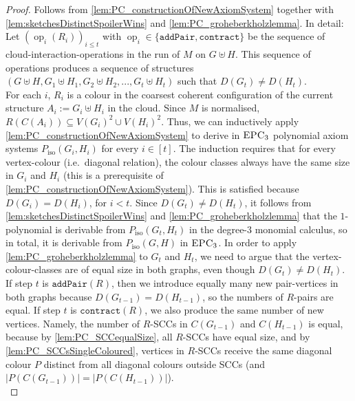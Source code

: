 \documentclass[10pt,a4paper]{article}
\newcommand{\EPC}{\mbox{\sc EPC}}
\newcommand{\pairOp }{\texttt{addPair}}
\newcommand{\sccOp }{\texttt{contract}}
\newcommand{\op}{\operatorname{op}}
\newcommand{\Piso}{P_{\text{iso}}}
\begin{document}
	\begin{proof}
		Follows from \autoref{lem:PC_constructionOfNewAxiomSystem} together with \autoref{lem:sketchesDistinctSpoilerWins} and \autoref{lem:PC_groheberkholzlemma}. In detail: Let $(\op_i(R_i))_{i \leq t}$ with $\op_i \in \{\pairOp, \sccOp\}$ be the sequence of cloud-interaction-operations in the run of $M$ on $G \uplus H$. This sequence of operations produces a sequence of structures $(G \uplus H, G_1 \uplus H_1, G_2 \uplus H_2, ..., G_t \uplus H_t)$ such that $D(G_t) \neq D(H_t)$.\\
		For each $i$, $R_i$ is a colour in the coarsest coherent configuration of the current structure $A_i := G_i \uplus H_i$ in the cloud. Since $M$ is normalised, $R(C(A_i)) \subseteq V(G_i)^2 \cup V(H_i)^2$. Thus, we can inductively apply \autoref{lem:PC_constructionOfNewAxiomSystem} to derive in $\EPC_3$ polynomial axiom systems $\Piso(G_i,H_i)$ for every $i \in [t]$. 
		The induction requires that for every vertex-colour (i.e.\ diagonal relation), the colour classes always have the same size in $G_i$ and $H_i$ (this is a prerequisite of \autoref{lem:PC_constructionOfNewAxiomSystem}). This is satisfied because $D(G_i) = D(H_i)$, for $i < t$.
		Since $D(G_t) \neq D(H_t)$, it follows from \autoref{lem:sketchesDistinctSpoilerWins} and \autoref{lem:PC_groheberkholzlemma} that the $1$-polynomial is derivable from  $\Piso(G_t,H_t)$ in the degree-$3$ monomial calculus, so in total, it is derivable from $\Piso(G,H)$ in $\EPC_3$. In order to apply \autoref{lem:PC_groheberkholzlemma} to $G_t$ and $H_t$, we need to argue that the vertex-colour-classes are of equal size in both graphs, even though $D(G_t) \neq D(H_t)$. If step $t$ is $\pairOp(R)$, then we introduce equally many new pair-vertices in both graphs because $D(G_{t-1}) = D(H_{t-1})$, so the numbers of $R$-pairs are equal. If step $t$ is $\sccOp(R)$, we also produce the same number of new vertices. Namely, the number of $R$-SCCs in $C(G_{t-1})$ and $C(H_{t-1})$ is equal, because by \autoref{lem:PC_SCCequalSize}, all $R$-SCCs have equal size, and by \autoref{lem:PC_SCCsSingleColoured}, vertices in $R$-SCCs receive the same diagonal colour $P$ distinct from all diagonal colours outside SCCs (and $|P(C(G_{t-1}))| = |P(C(H_{t-1}))|$).\\   
		

\end{proof}
\end{document}
